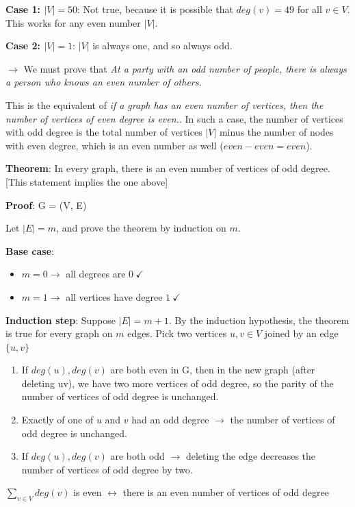 \documentclass[9pt, letterpaper, oneside]{article}
\begin{document}
\textbf{Case 1: $|V| = 50$}: Not true, because it is possible that $deg(v) = 49$ for all $v \in V$. This works for any even number $|V|$.

\textbf{Case 2: $|V| = 1$}: $|V|$ is always one, and so always odd.

$\to$ We must prove that \emph{At a party with an odd number of people, there is always a person who knows an even number of others.}

This is the equivalent of \emph{if a graph has an even number of vertices, then the number of vertices of even degree is even.}. In such a case, the number of vertices with odd degree is the total number of vertices $|V|$ minus the number of nodes with even degree, which is an even number as well ($even - even = even$).

\textbf{Theorem}: In every graph, there is an even number of vertices of odd degree. [This statement implies the one above]

\textbf{Proof}: G = (V, E) 

Let $|E| = m$, and prove the theorem by induction on $m$.

\textbf{Base case}: 
\begin{itemize}
	\item $m = 0 \to$ all degrees are $0 \ \checkmark$ 
	\item $m = 1 \to$ all vertices have degree $1 \ \checkmark$
\end{itemize}

\textbf{Induction step}:
Suppose $|E| = m + 1$. By the induction hypothesis, the theorem is true for every graph on $m$ edges. 
Pick two vertices $u,v \in V$ joined by an edge $\{u,v\}$
\begin{enumerate}
\item If $deg(u), deg(v)$ are both even in G, then in the new graph (after deleting uv), we have two more vertices of odd degree, so the parity of the number of vertices of odd degree is unchanged.
\item Exactly of one of $u$ and $v$ had an odd degree $\to$ the number of vertices of odd degree is unchanged.
\item If $deg(u), deg(v)$ are both odd $\to$ deleting the edge decreases the number of vertices of odd degree by two.
\end{enumerate}

$\displaystyle \sum_{v \in V} deg(v)$ is even $\leftrightarrow$ there is an even number of vertices of odd degree
\end{document}
